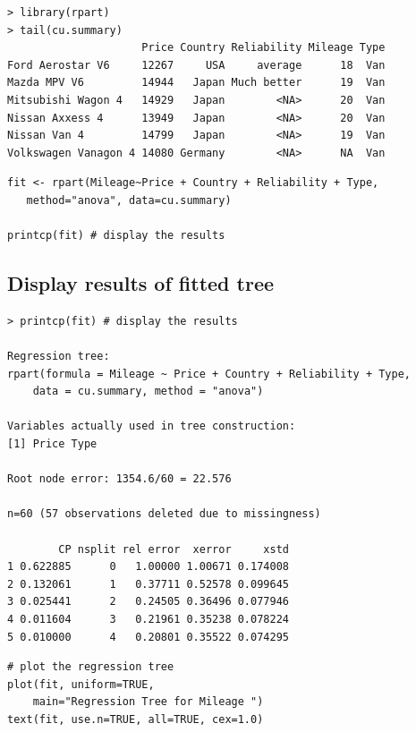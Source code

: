 \documentclass[caret-main.tex]{subfiles}
\begin{document}
\begin{verbatim}
> library(rpart)
> tail(cu.summary)
                     Price Country Reliability Mileage Type
Ford Aerostar V6     12267     USA     average      18  Van
Mazda MPV V6         14944   Japan Much better      19  Van
Mitsubishi Wagon 4   14929   Japan        <NA>      20  Van
Nissan Axxess 4      13949   Japan        <NA>      20  Van
Nissan Van 4         14799   Japan        <NA>      19  Van
Volkswagen Vanagon 4 14080 Germany        <NA>      NA  Van
\end{verbatim}



\begin{framed}
\begin{verbatim}
fit <- rpart(Mileage~Price + Country + Reliability + Type, 
   method="anova", data=cu.summary)

printcp(fit) # display the results 
\end{verbatim}
\end{framed}
\newpage
\subsection*{Display results of fitted tree}

\begin{verbatim}
> printcp(fit) # display the results 

Regression tree:
rpart(formula = Mileage ~ Price + Country + Reliability + Type, 
    data = cu.summary, method = "anova")

Variables actually used in tree construction:
[1] Price Type 

Root node error: 1354.6/60 = 22.576

n=60 (57 observations deleted due to missingness)

        CP nsplit rel error  xerror     xstd
1 0.622885      0   1.00000 1.00671 0.174008
2 0.132061      1   0.37711 0.52578 0.099645
3 0.025441      2   0.24505 0.36496 0.077946
4 0.011604      3   0.21961 0.35238 0.078224
5 0.010000      4   0.20801 0.35522 0.074295

\end{verbatim}
\newpage
\begin{framed}
\begin{verbatim}
# plot the regression tree 
plot(fit, uniform=TRUE, 
  	main="Regression Tree for Mileage ")
text(fit, use.n=TRUE, all=TRUE, cex=1.0)

\end{verbatim}
\end{framed}
\end{document}

